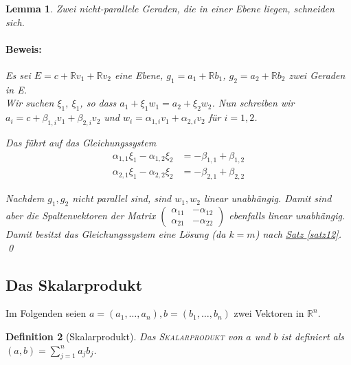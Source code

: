 \documentclass{report}
\newcommand{\IN}[1]{\index{#1|BH}}
\newcommand{\R}{\mathbb{R}}
\newcommand{\mRn}{\(\mathbb{R}^n\)}
\newcommand{\al}{\alpha}
\theoremstyle{customrem}
\theoremstyle{customdef}
\newtheorem{definition}{Definition}[chapter]
\newtheorem{lemma}[definition]{Lemma}
\renewenvironment{proof}{\paragraph{Beweis: }}{\qed}
\theoremstyle{customenv}
\newcommand{\defemph}[1]{\textsc{#1}}
\begin{document}
	\begin{lemma}
		Zwei nicht-parallele Geraden, die in einer Ebene liegen, schneiden sich.
		\begin{proof}
			Es sei \(E = c + \R v_1 + \R v_2\) eine Ebene, \(g_1 = a_1 + \R b_1\), \(g_2 = a_2 + \R b_2\) zwei Geraden in E.\\
			Wir suchen \(\xi_1,\ \xi_1\), so dass \(a_1 + \xi_1 w_1 = a_2 + \xi_2 w_2\). Nun schreiben wir \(a_i = c + \beta_{1,i} v_1 + \beta_{2,i} v_2\) und \(w_i = \al_{1,i} v_1 + \al_{2,i} v_2\) für \(i =1,2\).

			Das führt auf das Gleichungssystem
			\begin{align*}
				\al_{1,1} \xi_1 - \al_{1,2} \xi_2	&= - \beta_{1,1} + \beta_{1,2}\\
				\al_{2,1} \xi_1 - \al_{2,2} \xi_2 	&= - \beta_{2,1} + \beta_{2,2}
			\end{align*}

			Nachdem \(g_1, g_2\) nicht parallel sind, sind \(w_1, w_2\) linear unabhängig. Damit sind aber die Spaltenvektoren der Matrix \(\left(
			\begin{smallmatrix}
			\al_{11} & -\al_{12}\\
			\al_{21} & -\al_{22}
			\end{smallmatrix}\right)
			\) ebenfalls linear unabhängig. Damit besitzt das Gleichungssystem eine Lösung (da \(k = m\)) nach \hyperref[satz12]{Satz \ref*{satz12}}.
		\end{proof}
	\end{lemma}
	\vspace{.4cm}
	\subsection{Das Skalarprodukt}
	Im Folgenden seien \(a = (a_1, \dots, a_n), b = (b_1, \dots, b_n)\) zwei Vektoren in \mRn.

	\begin{definition}[Skalarprodukt]
		\IN{Skalarprodukt}
		Das \defemph{Skalarprodukt} von \(a\) und \(b\) ist definiert als \((a, b) = \sum_{j=1}^n a_j b_j\).
	\end{definition}
\end{document}

